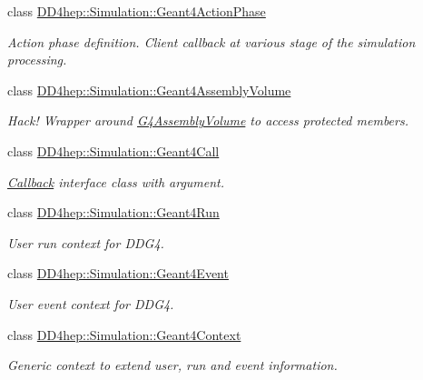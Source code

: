 \begin{DoxyCompactItemize}
class \hyperlink{class_d_d4hep_1_1_simulation_1_1_geant4_action_phase}{DD4hep::Simulation::Geant4ActionPhase}
\begin{DoxyCompactList}\small\item\em Action phase definition. Client callback at various stage of the simulation processing. \item\end{DoxyCompactList}\item 
class \hyperlink{class_d_d4hep_1_1_simulation_1_1_geant4_assembly_volume}{DD4hep::Simulation::Geant4AssemblyVolume}
\begin{DoxyCompactList}\small\item\em Hack! Wrapper around \hyperlink{class_g4_assembly_volume}{G4AssemblyVolume} to access protected members. \item\end{DoxyCompactList}\item 
class \hyperlink{class_d_d4hep_1_1_simulation_1_1_geant4_call}{DD4hep::Simulation::Geant4Call}
\begin{DoxyCompactList}\small\item\em \hyperlink{class_d_d4hep_1_1_callback}{Callback} interface class with argument. \item\end{DoxyCompactList}\item 
class \hyperlink{class_d_d4hep_1_1_simulation_1_1_geant4_run}{DD4hep::Simulation::Geant4Run}
\begin{DoxyCompactList}\small\item\em User run context for DDG4. \item\end{DoxyCompactList}\item 
class \hyperlink{class_d_d4hep_1_1_simulation_1_1_geant4_event}{DD4hep::Simulation::Geant4Event}
\begin{DoxyCompactList}\small\item\em User event context for DDG4. \item\end{DoxyCompactList}\item 
class \hyperlink{class_d_d4hep_1_1_simulation_1_1_geant4_context}{DD4hep::Simulation::Geant4Context}
\begin{DoxyCompactList}\small\item\em Generic context to extend user, run and event information. \item\end{DoxyCompactList}\item 

\end{DoxyCompactItemize}
